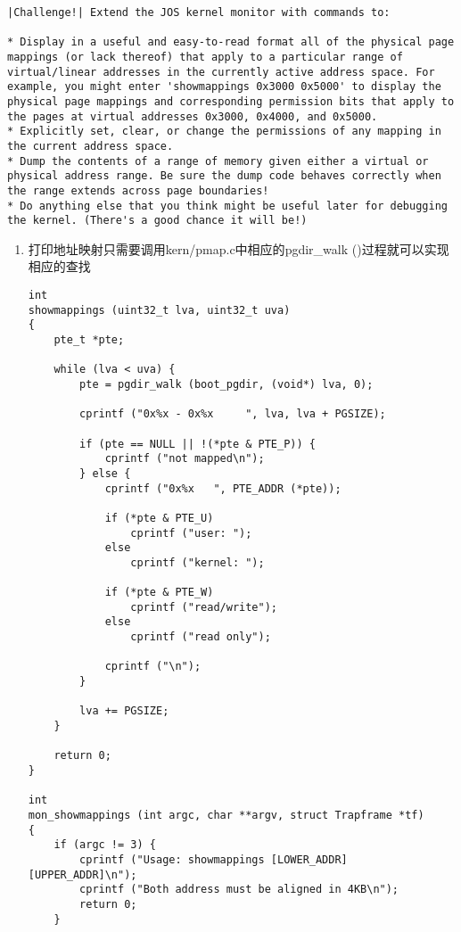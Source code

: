 \documentclass{article}
\newcommand{\funcname}[1]{{\ttfamily \small #1}}
\begin{document}
\begin{CJK*}{UTF8}{gkai}
\begin{lstlisting}[style=challenge]
|Challenge!| Extend the JOS kernel monitor with commands to:

* Display in a useful and easy-to-read format all of the physical page mappings (or lack thereof) that apply to a particular range of virtual/linear addresses in the currently active address space. For example, you might enter 'showmappings 0x3000 0x5000' to display the physical page mappings and corresponding permission bits that apply to the pages at virtual addresses 0x3000, 0x4000, and 0x5000.
* Explicitly set, clear, or change the permissions of any mapping in the current address space.
* Dump the contents of a range of memory given either a virtual or physical address range. Be sure the dump code behaves correctly when the range extends across page boundaries!
* Do anything else that you think might be useful later for debugging the kernel. (There's a good chance it will be!)
\end{lstlisting}

\begin{enumerate}
\item{打印地址映射只需要调用kern/pmap.c中相应的\funcname{pgdir\_walk ()}过程就可以实现相应的查找

\begin{lstlisting}[style=ccode, title={\scriptsize \ttfamily \bfseries kern/monitor.c}]
int 
showmappings (uint32_t lva, uint32_t uva)
{    
    pte_t *pte;
    
    while (lva < uva) {
        pte = pgdir_walk (boot_pgdir, (void*) lva, 0);

        cprintf ("0x%x - 0x%x     ", lva, lva + PGSIZE);

        if (pte == NULL || !(*pte & PTE_P)) {
            cprintf ("not mapped\n");
        } else {
            cprintf ("0x%x   ", PTE_ADDR (*pte));

            if (*pte & PTE_U) 
                cprintf ("user: ");
            else
                cprintf ("kernel: ");
            
            if (*pte & PTE_W) 
                cprintf ("read/write");
            else
                cprintf ("read only");

            cprintf ("\n");
        }

        lva += PGSIZE;
    }
 
    return 0;
}

int
mon_showmappings (int argc, char **argv, struct Trapframe *tf)
{
    if (argc != 3) {
        cprintf ("Usage: showmappings [LOWER_ADDR] [UPPER_ADDR]\n");
        cprintf ("Both address must be aligned in 4KB\n");
        return 0;
    }


\end{lstlisting}}
\end{enumerate}
\end{CJK*}
\end{document}
